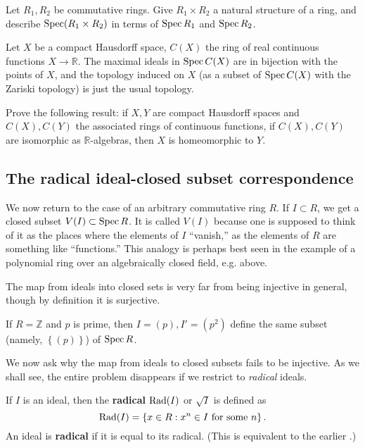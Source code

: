 \begin{exercise} 
Let $R_1, R_2$ be commutative rings. Give $R_1 \times R_2$ a
natural structure
of a ring, and describe $\operatorname{Spec}( R_1 \times R_2)$ in terms of
$\operatorname{Spec} R_1$ and
$\operatorname{Spec} R_2$.
\end{exercise} 


\begin{exercise} 
Let $X$ be a compact Hausdorff space, $C(X)$ the ring of real
continuous
functions $X \to \mathbb{R}$. 
The maximal ideals in $\operatorname{Spec} C(X)$ are in bijection with the
points of $X$,
and the topology induced on $X $ (as a subset of $\operatorname{Spec} C(X)$ with the Zariski
topology)
is just the usual topology.
\end{exercise}

\begin{exercise}
Prove the following result: if $X, Y$ are compact Hausdorff
spaces and $C(X),
C(Y)$ the associated rings of continuous functions, if $C(X),
C(Y)$ are
isomorphic as $\mathbb{R}$-algebras, then $X$ is homeomorphic to
$Y$.
\end{exercise} 


\subsection{The radical ideal-closed subset correspondence}

We now return to the case of an arbitrary commutative ring $R$.
If $I \subset R$, we get a closed
subset $V(I) \subset \operatorname{Spec} R$. It is called $V(I)$ because one
is supposed to
think of it as the places where the elements of $I$ ``vanish,''
as the
elements of $R$ are something like ``functions.'' This analogy
is perhaps best
seen in the example of a polynomial ring over an algebraically
closed field,
e.g.  above.

The map from ideals into closed sets is very far from being
injective in
general, though by definition it is surjective.

\begin{example} 
If $R = \mathbb{Z}$ and $p$ is prime, then $I = (p), I' = (p^2)$
define the
same subset (namely, $\left\{(p)\right\}$) of
$\operatorname{Spec} R$. 
\end{example} 

We now ask why the map from ideals to closed
subsets fails to
be injective. As we shall see, the entire problem disappears if
we restrict to
\emph{radical} ideals.

\begin{definition} 
If $I$ is an ideal, then the \textbf{radical} $\operatorname{Rad}(I) $ or $
\sqrt{I}$ is
defined as $$\operatorname{Rad}(I) =
\left\{x \in R: x^n \in I \ \mathrm{for} \ \mathrm{some} \ n
\right\}.$$
An ideal is \textbf{radical} if it is equal to its radical.
(This is
equivalent to the earlier .) 
\end{definition} 

